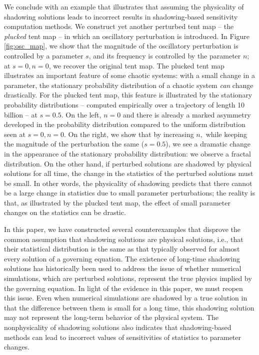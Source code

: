We conclude with an example that illustrates that assuming the 
physicality of shadowing solutions leads to incorrect results in shadowing-based sensitivity 
computation methods. We construct yet another perturbed tent map -- the \emph{plucked} 
tent map -- in which an oscillatory perturbation is introduced. In Figure \ref{fig:osc_map}, we show that the magnitude of the oscillatory perturbation is controlled by a parameter $s$, and its frequency is controlled by the parameter $n$; at $s=0,n=0$, we recover the original tent map. The plucked tent map illustrates an important feature of some chaotic systems: with a small change in a parameter, the stationary probability distribution of a chaotic system \emph{can} change drastically. For the plucked tent map, this feature is illustrated by the stationary probability distributions -- computed empirically over a trajectory of length 10 billion -- at $s=0.5$. On the left, $n=0$ and there is already a marked asymmetry developed in the probability distribution compared to the uniform distribution seen at $s=0, n=0$. On the right, we show that by increasing $n,$ while keeping the magnitude of the perturbation the same ($s=0.5$), we see a dramatic change in the appearance of the stationary probability distribution: we observe a fractal distribution.  On the other hand, if perturbed solutions are shadowed by physical solutions for all time, the change in the statistics of the perturbed solutions must be small. In other words, the physicality of shadowing predicts that there cannot be a large change in statistics due to small parameter perturbations; the reality is that, as illustrated by the plucked tent map, the effect of small parameter changes on the statistics can be drastic.  

In this paper, we have constructed several counterexamples that disprove the common 
assumption that shadowing solutions are physical solutions, i.e., that their 
statistical distribution is the same as that typically observed for almost every solution 
of a governing equation. The existence of long-time shadowing solutions \cite{grebogi} has historically been used to address the issue of whether numerical simulations, which are 
perturbed solutions, represent the true physics implied by the governing equation. In light of the evidence in this paper, we must reopen this issue. Even when numerical simulations are 
shadowed by a true solution in that the difference between them is small for a long time, this shadowing solution may not represent the long-term behavior of the physical system. The nonphysicality of shadowing solutions also indicates that shadowing-based methods \cite{qiqi-lss} can lead to incorrect values of sensitivities of statistics to parameter changes. 







